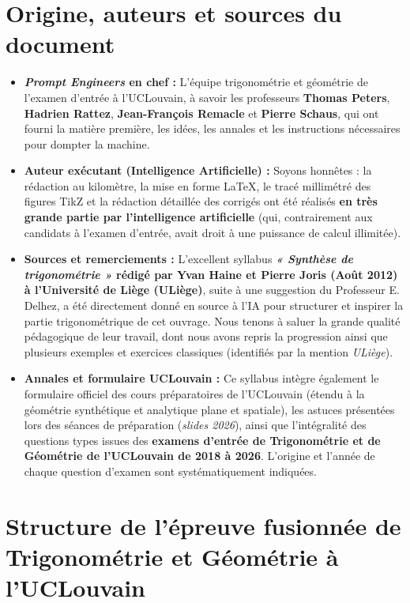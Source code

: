 \documentclass[11pt,a4paper,oneside]{book}
\begin{document}
\section*{Origine, auteurs et sources du document}

\begin{theoreme}
\begin{itemize}
    \item \textbf{\emph{Prompt Engineers} en chef :} L'équipe trigonométrie et géométrie de l'examen d'entrée à l'UCLouvain, à savoir les professeurs \textbf{Thomas Peters}, \textbf{Hadrien Rattez}, \textbf{Jean-François Remacle} et \textbf{Pierre Schaus}, qui ont fourni la matière première, les idées, les annales et les instructions nécessaires pour dompter la machine.
    \item \textbf{Auteur exécutant (Intelligence Artificielle) :} Soyons honnêtes : la rédaction au kilomètre, la mise en forme \LaTeX{}, le tracé millimétré des figures TikZ et la rédaction détaillée des corrigés ont été réalisés \textbf{en très grande partie par l'intelligence artificielle} (qui, contrairement aux candidats à l'examen d'entrée, avait droit à une puissance de calcul illimitée).
    \item \textbf{Sources et remerciements :} L'excellent syllabus \textbf{\emph{« Synthèse de trigonométrie »} rédigé par Yvan Haine et Pierre Joris (Août 2012) à l'Université de Liège (ULiège)}, suite à une suggestion du Professeur E. Delhez, a été directement donné en source à l'IA pour structurer et inspirer la partie trigonométrique de cet ouvrage. Nous tenons à saluer la grande qualité pédagogique de leur travail, dont nous avons repris la progression ainsi que plusieurs exemples et exercices classiques (identifiés par la mention \emph{ULiège}).
    \item \textbf{Annales et formulaire UCLouvain :} Ce syllabus intègre également le formulaire officiel des cours préparatoires de l'UCLouvain (étendu à la géométrie synthétique et analytique plane et spatiale), les astuces présentées lors des séances de préparation (\emph{slides 2026}), ainsi que l'intégralité des questions types issues des \textbf{examens d'entrée de Trigonométrie et de Géométrie de l'UCLouvain de 2018 à 2026}. L'origine et l'année de chaque question d'examen sont systématiquement indiquées.
\end{itemize}
\end{theoreme}

\section*{Structure de l'épreuve fusionnée de Trigonométrie et Géométrie à l'UCLouvain}
\end{document}
